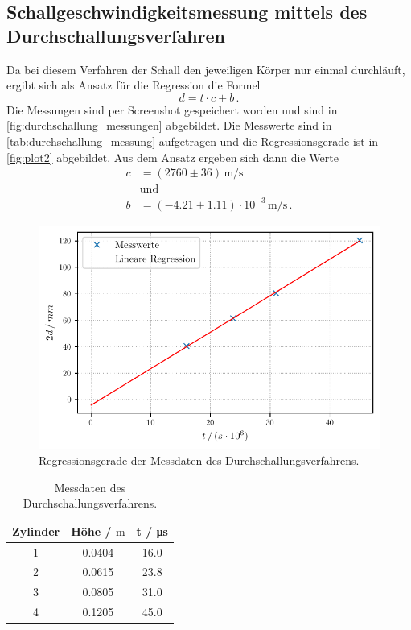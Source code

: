 \subsection{Schallgeschwindigkeitsmessung mittels des Durchschallungsverfahren}
Da bei diesem Verfahren der Schall den jeweiligen Körper nur einmal durchläuft, ergibt sich als Ansatz für die Regression die Formel
\begin{equation*}
  d = t \cdot c + b \, .
\end{equation*}
Die Messungen sind per Screenshot gespeichert worden und sind in \autoref{fig:durchschallung_messungen} abgebildet.
Die Messwerte sind in \autoref{tab:durchschallung_messung} aufgetragen und die Regressionsgerade ist in \autoref{fig:plot2} abgebildet.
Aus dem Ansatz ergeben sich dann die Werte
\begin{align*}
  c &= (2760 \pm 36)  \, \unit{\meter / \second}\\
  &\text{und}\\
  b &= (-4.21 \pm 1.11) \cdot 10^{-3} \, \unit{\meter / \second} \, .
\end{align*}



\begin{figure}
  \centering
  \includegraphics[width = 0.7\linewidth]{build/plot2.pdf}
  \caption{Regressionsgerade der Messdaten des Durchschallungsverfahrens.}
  \label{fig:plot2}
\end{figure}

\begin{table}
  \centering
  \caption{Messdaten des Durchschallungsverfahrens.}
  \label{tab:durchschallung_messung}
  \begin{tabular}{c | c c}
      \toprule
      Zylinder& Höhe / $\unit\meter$ & t / \unit{\micro\second}\\ 
      \midrule
      1     & 0.0404 & 16.0 \\
      2     & 0.0615 & 23.8 \\
      3     & 0.0805 & 31.0 \\
      4     & 0.1205 & 45.0 \\
      \bottomrule
  \end{tabular}
\end{table}

